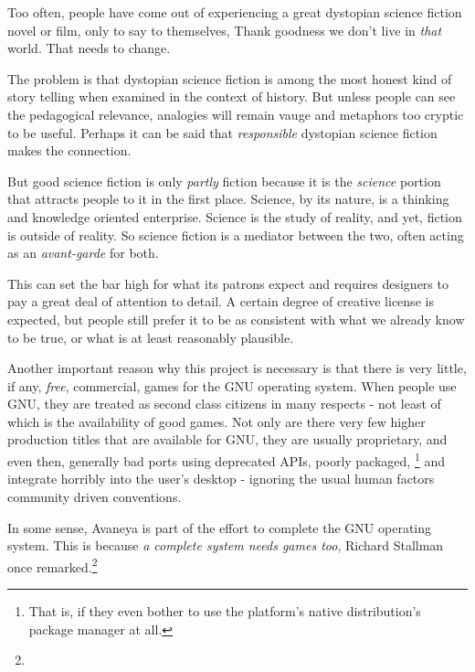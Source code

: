 

Too often, people have come out of experiencing a great dystopian science fiction novel or film, only to say to themselves, Thank goodness we don't live in {\it that} world. That needs to change.

The problem is that dystopian science fiction is among the most honest kind of story telling when examined in the context of history. But unless people can see the pedagogical relevance, analogies will remain vauge and metaphors too cryptic to be useful. Perhaps it can be said that {\it responsible} dystopian science fiction makes the connection.

But good science fiction is only {\it partly} fiction because it is the {\it science} portion that attracts people to it in the first place. Science, by its nature, is a thinking and knowledge oriented enterprise. Science is the study of reality, and yet, fiction is outside of reality. So science fiction is a mediator between the two, often acting as an {\it avant-garde} for both.

This can set the bar high for what its patrons expect and requires designers to pay a great deal of attention to detail. A certain degree of creative license is expected, but people still prefer it to be as consistent with what we already know to be true, or what is at least reasonably plausible.

Another important reason why this project is necessary is that there is very little, if any, {\it free}, commercial, games for the GNU operating system. When people use GNU, they are treated as second class citizens in many respects - not least of which is the availability of good games. Not only are there very few higher production titles that are available for GNU, they are usually proprietary, and even then, generally bad ports using deprecated APIs, poorly packaged, \footnote{That is, if they even bother to use the platform's native distribution's package manager at all.} and integrate horribly into the user's desktop - ignoring the usual human factors community driven conventions.

In some sense, Avaneya is part of the effort to complete the GNU operating system. This is because {\it a complete system needs games too}, Richard Stallman once remarked.\footnote{}

